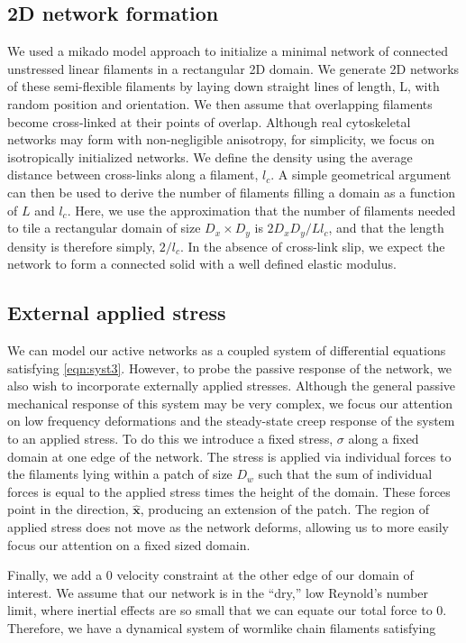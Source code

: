 \documentclass[10pt,letterpaper]{article}
\begin{document}
\subsection*{2D network formation}

We used a mikado model approach \cite{Unterberger2014} to initialize a minimal network of connected unstressed linear filaments in a rectangular 2D domain. We generate 2D networks of these semi-flexible filaments by laying down straight lines of length, L, with random position and orientation. We then assume that overlapping filaments become cross-linked at their points of overlap. Although real cytoskeletal networks may form with non-negligible anisotropy, for simplicity, we focus on isotropically initialized networks. We define the density using the average distance between cross-links along a filament, $l_c$. A simple geometrical argument can then be used to derive the number of filaments filling a domain as a function of $L$ and $l_c$\cite{theo_hlm}.  Here, we use the approximation that the number of filaments needed to tile a rectangular domain of size $D_x \times D_y$  is $2D_xD_y/Ll_c$, and that the length density is therefore simply, $2/l_c$. In the absence of cross-link slip, we expect the network to form a connected solid with a well defined elastic modulus\cite{theo_hlm,theo_hlm2}.


\subsection*{External applied stress}
We can model our active networks as a coupled system of differential equations satisfying \ref{eqn:syst3}.  However, to probe the passive response of the network, we also wish to incorporate externally applied stresses.  Although the general passive mechanical response of this system may be very complex, we focus our attention on low frequency deformations and the steady-state creep response of the system to an applied stress.  To do this we introduce a fixed stress, $\sigma$ along a fixed domain at one edge of the network.  The stress is applied via individual forces to the filaments lying within a patch of size $D_w$ such that the sum of individual forces is equal to the applied stress times the height of the domain.  These forces point in the direction, $\mathbf{\hat{x}}$, producing an extension of the patch.  The region of applied stress does not move as the network deforms, allowing us to more easily focus our attention on a fixed sized domain. 

Finally, we add a 0 velocity constraint at the other edge of our domain of interest.  We assume that our network is in the ``dry,'' low Reynold's number limit, where inertial effects are so small that we can equate our total force to 0.  Therefore, we have a dynamical system of wormlike chain filaments satisfying
\end{document}
